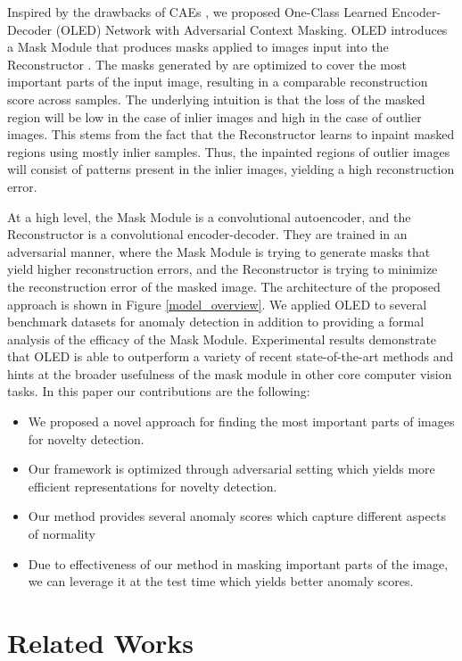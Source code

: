 \documentclass[10pt,twocolumn,letterpaper]{article}
\begin{document}
Inspired by the drawbacks of CAEs \cite{pathak2016context}, we proposed One-Class Learned Encoder-Decoder (OLED) Network with Adversarial Context Masking. OLED introduces a Mask Module  that produces masks applied to images input into the Reconstructor . The masks generated by  are optimized to cover the most important parts of the input image, resulting in a comparable reconstruction score across samples. The underlying intuition is that the loss of the masked region will be low in the case of inlier images and high in the case of outlier images. This stems from the fact that the Reconstructor learns to inpaint masked regions using mostly inlier samples. Thus, the inpainted regions of outlier images will consist of patterns present in the inlier images, yielding a high reconstruction error. 

At a high level, the Mask Module is a convolutional autoencoder, and the Reconstructor is a convolutional encoder-decoder. They are trained in an adversarial manner, where the Mask Module is trying to generate masks that yield higher reconstruction errors, and the Reconstructor is trying to minimize the reconstruction error of the masked image. The architecture of the proposed approach is shown in Figure \ref{model_overview}. We applied OLED to several benchmark datasets for anomaly detection in addition to providing a formal analysis of the efficacy of the Mask Module. Experimental results demonstrate that OLED is able to outperform a variety of recent state-of-the-art methods and hints at the broader usefulness of the mask module in other core computer vision tasks. In this paper our contributions are the following:
\begin{itemize}
    \item We proposed a novel approach for finding the most important parts of images for novelty detection.
    \item Our framework is optimized through adversarial setting which yields more efficient representations for novelty detection.
    \item Our method provides several anomaly scores which capture different aspects of normality
    \item Due to effectiveness of our method in masking important parts of the image, we can leverage it at the test time which yields better anomaly scores.
\end{itemize}





\section{Related Works}
\end{document}
